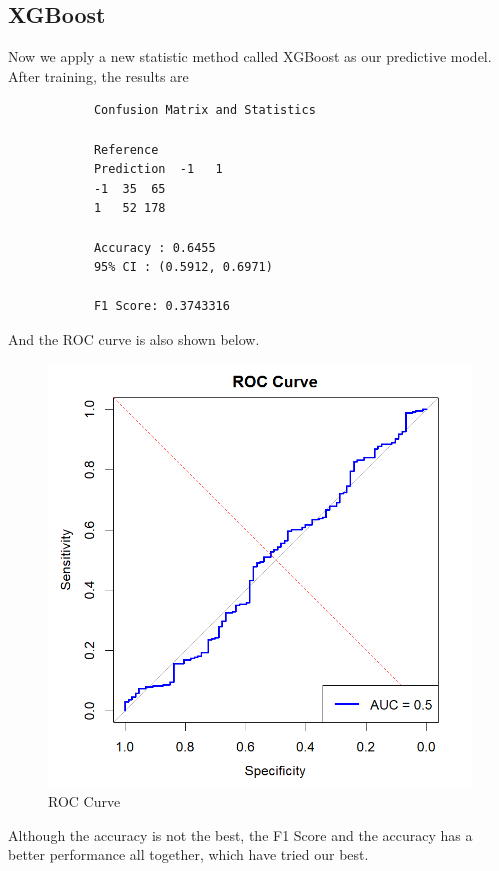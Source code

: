 \documentclass{article}
\begin{document}
	\subsection{XGBoost}
	\par Now we apply a new statistic method called XGBoost as our predictive model. After training, the results are
	\begin{framed}
		\begin{verbatim}
			Confusion Matrix and Statistics
			
			Reference
			Prediction  -1   1
			-1  35  65
			1   52 178
			
			Accuracy : 0.6455          
			95% CI : (0.5912, 0.6971)            
			
			F1 Score: 0.3743316      
		\end{verbatim}
	\end{framed}
	And the ROC curve is also shown below.
	\begin{figure}[htbp]
		\centering
		\includegraphics[scale = 0.5]{Pics/ROC_Curve}
		\caption{ROC Curve}
		\label{fig:roccurve}
	\end{figure}
	Although the accuracy is not the best, the F1 Score and the accuracy has a better performance all together, which have tried our best.
	\clearpage
\end{document}
